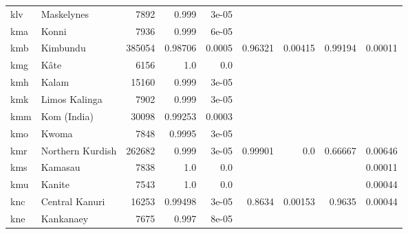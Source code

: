 \documentclass[11pt]{article}
\begin{document}
\begin{table*}[h]
{\begin{tabular}{llrrrrrrr}
klv         & Maskelynes         & 7892         & 0.999         & 3e-05         &          &          &          &          \\

kma         & Konni         & 7936         & 0.999         & 6e-05         &          &          &          &          \\

kmb         & Kimbundu         & 385054         & 0.98706         & 0.0005         & 0.96321         & 0.00415         & 0.99194         & 0.00011         \\

kmg         & Kâte         & 6156         & 1.0         & 0.0         &          &          &          &          \\

kmh         & Kalam         & 15160         & 0.999         & 3e-05         &          &          &          &          \\

kmk         & Limos Kalinga         & 7902         & 0.999         & 3e-05         &          &          &          &          \\

kmm         & Kom (India)         & 30098         & 0.99253         & 0.0003         &          &          &          &          \\

kmo         & Kwoma         & 7848         & 0.9995         & 3e-05         &          &          &          &          \\

kmr         & Northern Kurdish         & 262682         & 0.999         & 3e-05         & 0.99901         & 0.0         & 0.66667         & 0.00646         \\

kms         & Kamasau         & 7838         & 1.0         & 0.0         &          &          &          & 0.00011         \\

kmu         & Kanite         & 7543         & 1.0         & 0.0         &          &          &          & 0.00044         \\

knc         & Central Kanuri         & 16253         & 0.99498         & 3e-05         & 0.8634         & 0.00153         & 0.9635         & 0.00044         \\

kne         & Kankanaey         & 7675         & 0.997         & 8e-05         &          &          &          &          \\


\end{tabular}}
\end{table*}
\end{document}
